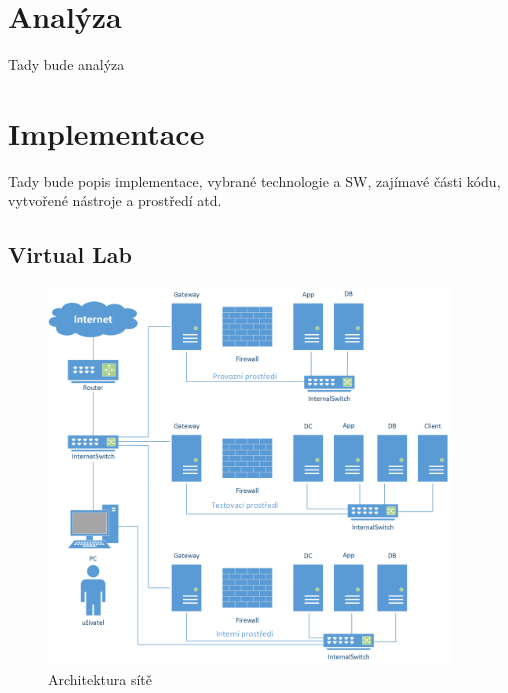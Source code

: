 \section{Analýza}
Tady bude analýza

\section{Implementace}
Tady bude popis implementace, vybrané technologie a SW, zajímavé části kódu, vytvořené nástroje a prostředí atd.

\subsection{Virtual Lab}
\begin{figure}[]
  \centering
  \includegraphics[height=10cm]{fig/network.png}
  \caption{Architektura sítě}
  \label{fig:architekturasite}
\end{figure}

